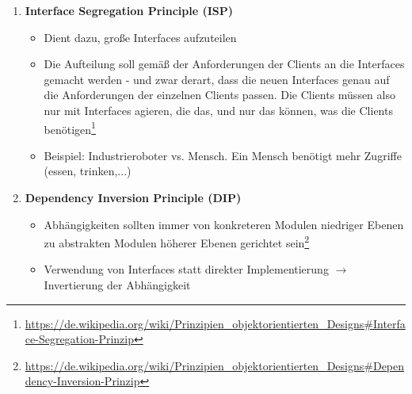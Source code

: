 \begin{enumerate}
\begin{itemize}
	\end{itemize}
	\item \textbf{Interface Segregation Principle (ISP)}
	\begin{itemize}
		\item Dient dazu, große Interfaces aufzuteilen
		\item Die Aufteilung soll gemäß der Anforderungen der Clients an die Interfaces gemacht werden - und zwar derart, dass die neuen Interfaces genau auf die Anforderungen der einzelnen Clients passen. Die Clients müssen also nur mit Interfaces agieren, die das, und nur das können, was die Clients benötigen\footnote{\url{https://de.wikipedia.org/wiki/Prinzipien_objektorientierten_Designs\#Interface-Segregation-Prinzip}}
		\item Beispiel: Industrieroboter vs. Mensch. Ein Mensch benötigt mehr Zugriffe (essen, trinken,...)
	\end{itemize}
	\item \textbf{Dependency Inversion Principle (DIP)}
	\begin{itemize}
		\item Abhängigkeiten sollten immer von konkreteren Modulen niedriger Ebenen zu abstrakten Modulen höherer Ebenen gerichtet sein\footnote{\url{https://de.wikipedia.org/wiki/Prinzipien_objektorientierten_Designs\#Dependency-Inversion-Prinzip}}
		\item Verwendung von Interfaces statt direkter Implementierung \(\rightarrow\) Invertierung der Abhängigkeit 
	\end{itemize}
\end{enumerate}


